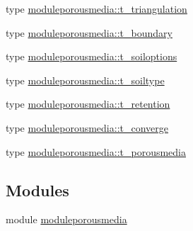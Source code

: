 \begin{DoxyCompactItemize}
type \mbox{\hyperlink{structmoduleporousmedia_1_1t__triangulation}{moduleporousmedia\+::t\+\_\+triangulation}}
\item 
type \mbox{\hyperlink{structmoduleporousmedia_1_1t__boundary}{moduleporousmedia\+::t\+\_\+boundary}}
\item 
type \mbox{\hyperlink{structmoduleporousmedia_1_1t__soiloptions}{moduleporousmedia\+::t\+\_\+soiloptions}}
\item 
type \mbox{\hyperlink{structmoduleporousmedia_1_1t__soiltype}{moduleporousmedia\+::t\+\_\+soiltype}}
\item 
type \mbox{\hyperlink{structmoduleporousmedia_1_1t__retention}{moduleporousmedia\+::t\+\_\+retention}}
\item 
type \mbox{\hyperlink{structmoduleporousmedia_1_1t__converge}{moduleporousmedia\+::t\+\_\+converge}}
\item 
type \mbox{\hyperlink{structmoduleporousmedia_1_1t__porousmedia}{moduleporousmedia\+::t\+\_\+porousmedia}}
\end{DoxyCompactItemize}
\subsection*{Modules}
\begin{DoxyCompactItemize}
\item 
module \mbox{\hyperlink{namespacemoduleporousmedia}{moduleporousmedia}}
\end{DoxyCompactItemize}
